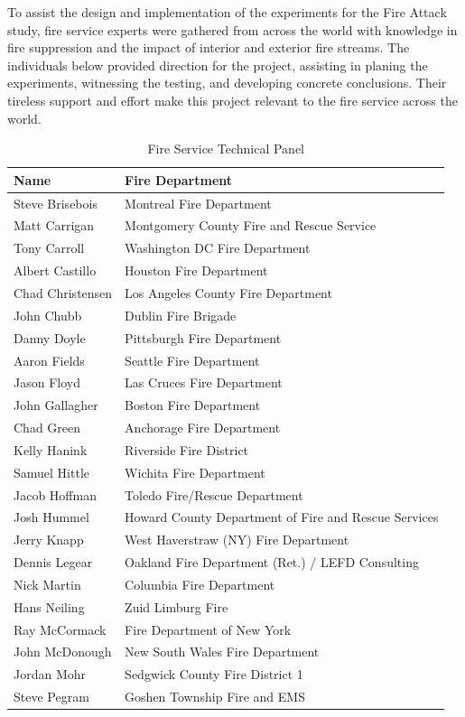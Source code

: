 \documentclass[12pt,oneside]{book}
\begin{document}
\clearpage

To assist the design and implementation of the experiments for the Fire Attack study, fire service experts were gathered from across the world with knowledge in fire suppression and the impact of interior and exterior fire streams. The individuals below provided direction for the project, assisting in planing the experiments, witnessing the testing, and developing concrete conclusions. Their tireless support and effort make this project relevant to the fire service across the world. 

\begin{table}[!ht]
	\centering
	\caption*{Fire Service Technical Panel}
	\begin{tabular}{|l|l|}
		\hline
		Name & Fire Department \\ 
		\hline \hline
		Steve Brisebois  & Montreal Fire Department \\ \hline
		Matt Carrigan    & Montgomery County Fire and Rescue Service \\ \hline
		Tony Carroll     & Washington DC Fire Department \\ \hline
		Albert Castillo  & Houston Fire Department \\ \hline
		Chad Christensen & Los Angeles County Fire Department \\ \hline
		John Chubb       & Dublin Fire Brigade \\ \hline	 		  
		Danny Doyle      & Pittsburgh Fire Department \\ \hline
		Aaron Fields     & Seattle Fire Department \\ \hline
		Jason Floyd      & Las Cruces Fire Department \\ \hline
		John Gallagher   & Boston Fire Department \\ \hline
		Chad Green       & Anchorage Fire Department \\ \hline
		Kelly Hanink     & Riverside Fire District \\ \hline
		Samuel Hittle    & Wichita Fire Department \\ \hline
		Jacob Hoffman    & Toledo Fire/Rescue Department \\ \hline
		Josh Hummel      & Howard County Department of Fire and Rescue Services \\ \hline
		Jerry Knapp      & West Haverstraw (NY) Fire Department \\ \hline
		Dennis Legear    & Oakland Fire Department (Ret.) / LEFD Consulting \\ \hline
		Nick Martin      & Columbia Fire Department \\ \hline
		Hans Neiling     & Zuid Limburg Fire \\ \hline
		Ray McCormack    & Fire Department of New York \\ \hline
		John McDonough   & New South Wales Fire Department \\ \hline
		Jordan Mohr      & Sedgwick County Fire District 1 \\ \hline
		Steve Pegram     & Goshen Township Fire and EMS \\ \hline
	\end{tabular}
\end{table}
\end{document}
